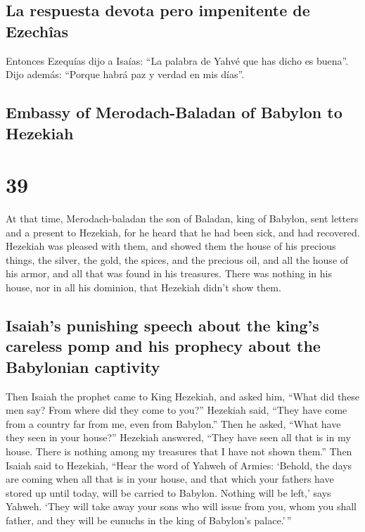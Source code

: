 \begin{paracol}{2}
\hypertarget{la-respuesta-devota-pero-impenitente-de-ezechuxeeas}{%
\subsection{La respuesta devota pero impenitente de
Ezechîas}\label{la-respuesta-devota-pero-impenitente-de-ezechuxeeas}}

 Entonces Ezequías dijo a Isaías: ``La palabra de Yahvé
que has dicho es buena''. Dijo además: ``Porque habrá paz y verdad en
mis días''.

\switchcolumn
\begin{otherlanguage}{english}

\hypertarget{embassy-of-merodach-baladan-of-babylon-to-hezekiah}{%
\subsection{Embassy of Merodach-Baladan of Babylon to
Hezekiah}\label{embassy-of-merodach-baladan-of-babylon-to-hezekiah}}

\hypertarget{section-77}{%
\section{39}\label{section-77}}

 At that time, Merodach-baladan the son of Baladan, king
of Babylon, sent letters and a present to Hezekiah, for he heard that he
had been sick, and had recovered.  Hezekiah was pleased
with them, and showed them the house of his precious things, the silver,
the gold, the spices, and the precious oil, and all the house of his
armor, and all that was found in his treasures. There was nothing in his
house, nor in all his dominion, that Hezekiah didn't show them.

\hypertarget{isaiahs-punishing-speech-about-the-kings-careless-pomp-and-his-prophecy-about-the-babylonian-captivity}{%
\subsection{Isaiah's punishing speech about the king's careless pomp and
his prophecy about the Babylonian
captivity}\label{isaiahs-punishing-speech-about-the-kings-careless-pomp-and-his-prophecy-about-the-babylonian-captivity}}

 Then Isaiah the prophet came to King Hezekiah, and asked
him, ``What did these men say? From where did they come to you?''
Hezekiah said, ``They have come from a country far from me, even from
Babylon.''  Then he asked, ``What have they seen in your
house?'' Hezekiah answered, ``They have seen all that is in my house.
There is nothing among my treasures that I have not shown them.''
 Then Isaiah said to Hezekiah, ``Hear the word of Yahweh
of Armies:  `Behold, the days are coming when all that is
in your house, and that which your fathers have stored up until today,
will be carried to Babylon. Nothing will be left,' says Yahweh.
 `They will take away your sons who will issue from you,
whom you shall father, and they will be eunuchs in the king of Babylon's
palace.'\,''


\end{otherlanguage}
\end{paracol}
